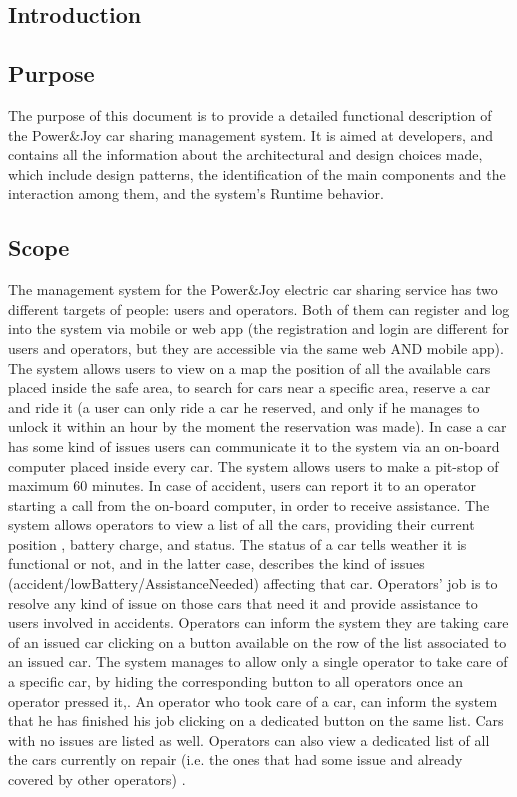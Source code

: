 \documentclass{article}
\begin{document}
\newpage   			%
\begin{flushleft}  

  \section{Introduction}


\subsection{Purpose}%

The purpose of this document is to provide a detailed functional description of the Power\&Joy car sharing management system. It is aimed at developers, and contains all the information about the architectural and design choices made, which include design patterns, the identification of the main components and the interaction among them, and the system's Runtime behavior.   
  
\subsection{Scope} %
The management system for the  Power\&Joy electric car sharing service has two different targets of people: users and operators. 
Both of them can register and log into the system via mobile or web app (the registration and login are different for users and operators, but they are accessible via the same web AND mobile app). 
The system allows users to view on a map the position of all the available cars placed inside the safe area, to search for cars  near a specific area, reserve a car and ride it (a user can only ride a car he reserved, and only if he manages to unlock it within an hour by the moment the reservation was made). In case a car has some kind of issues users can communicate it to the system via an on-board computer placed inside every car. The system allows users to make a pit-stop of maximum 60 minutes. In case of accident, users can report it to an operator starting a call from the on-board computer, in order to receive assistance.
The system allows operators to view a list of all the cars, providing their current position , battery charge, and status. The status of a car tells weather it is functional or not, and in the latter case, describes the kind of issues (accident/lowBattery/AssistanceNeeded) affecting that car. Operators' job is to resolve any kind of issue on those cars that need it and provide assistance to users involved in accidents. Operators can inform the system they are taking care of an issued car clicking on a button available on the row of the list associated to an issued car. The system manages to allow only a single operator to take care of a specific car, by hiding the corresponding button to all operators once an operator pressed it,.  An operator who took care of a car, can inform the system that he has finished his job clicking on a dedicated button on the same list. Cars with no issues are listed as well. Operators can also view a dedicated list of all the cars currently on repair (i.e. the ones that had some issue and already covered by other operators) .


\end{flushleft}
\end{document}
